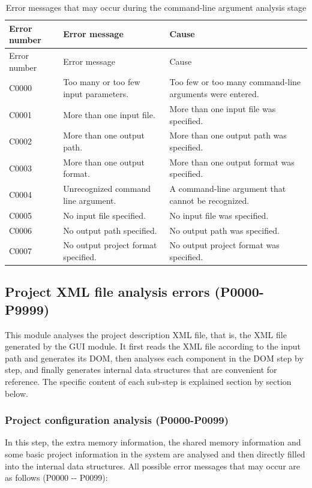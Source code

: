 \begin{xltabular}{\textwidth}{@{}>{\hsize\raggedright\arraybackslash}X>{\hsize\raggedright\arraybackslash}X>{\hsize\raggedright\arraybackslash}X@{}}
\caption{Error messages that may occur during the command-line argument analysis stage}\label{tab:5-2}\\
\toprule
Error number & Error message & Cause\tabularnewline
\endfirsthead
\toprule
Error number & Error message & Cause\tabularnewline
\midrule
\endhead
\bottomrule
\endlastfoot
C0000 & Too many or too few input parameters. &
Too few or too many command-line arguments were entered.\tabularnewline
C0001 & More than one input file. &
More than one input file was specified.\tabularnewline
C0002 & More than one output path. &
More than one output path was specified.\tabularnewline
C0003 & More than one output format. &
More than one output format was specified.\tabularnewline
C0004 & Unrecognized command line argument. &
A command-line argument that cannot be recognized.\tabularnewline
C0005 & No input file specified. & No input file was specified.\tabularnewline
C0006 & No output path specified. & No output path was specified.\tabularnewline
C0007 & No output project format specified. &
No output project format was specified.\tabularnewline
\end{xltabular}

\subsection{Project XML file analysis errors (P0000-P9999)}\label{subsec:5-6-2}

This module analyses the project description XML file, that is, the XML file generated by the GUI module. It first reads the XML file according to the input path and generates its DOM, then analyses each component in the DOM step by step, and finally generates internal data structures that are convenient for reference. The specific content of each sub-step is explained section by section below.

\subsubsection{Project configuration analysis (P0000-P0099)}\label{subsubsec:5-6-2-1}

In this step, the extra memory information, the shared memory information and some basic project information in the system are analysed and then directly filled into the internal data structures. All possible error messages that may occur are as follows (P0000
-\/- P0099):

